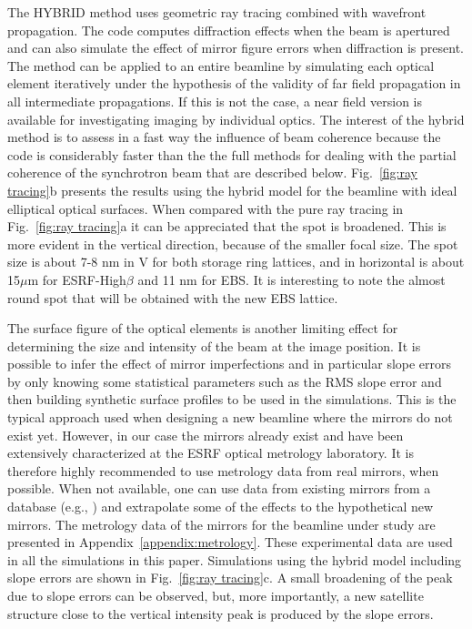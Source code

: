 \documentclass{iucr}              %
\begin{document}
The HYBRID method \cite{hybrid} uses geometric ray tracing combined with wavefront propagation. The code computes diffraction effects when the beam is apertured and can also simulate the effect of mirror figure errors when diffraction is present. The method can be applied to an entire beamline by simulating each optical element iteratively under the hypothesis of the validity of far field propagation in all intermediate propagations. If this is not the case, a near field version is available for investigating imaging by individual optics. The interest of the hybrid method is to assess in a fast way the influence of beam coherence because the code is considerably faster than the the full methods for dealing with the partial coherence of the synchrotron beam that are described below. Fig.~\ref{fig:ray tracing}b presents the results using the hybrid model for the beamline with ideal elliptical optical surfaces. When compared with the pure ray tracing in Fig.~\ref{fig:ray tracing}a it can be appreciated that the spot is broadened. This is more evident in the vertical direction, because of the smaller focal size. The spot size is about 7-8 nm in V for both storage ring lattices, and in horizontal is about 15$\mu$m for ESRF-High$\beta$ and 11 nm for EBS. It is interesting to note the almost round spot that will be obtained with the new EBS lattice. 

The surface figure of the optical elements is another limiting effect for determining the size and intensity of the beam at the image position. It is possible to infer the effect of mirror imperfections and in particular slope errors by only knowing some statistical parameters such as the RMS slope error  and then building synthetic surface profiles to be used in the simulations. This is the typical approach used when designing a new beamline where the mirrors do not exist yet. However, in our case the mirrors already exist and have been extensively characterized at the ESRF optical metrology laboratory. It is therefore highly recommended to use metrology data from real mirrors, when possible. When not available, one can use data from existing mirrors from a database (e.g., \cite{dabam}) and extrapolate some of the effects to the hypothetical new mirrors. The metrology data of the mirrors for the beamline under study are presented in Appendix~\ref{appendix:metrology}. These experimental data are used in all the simulations in this paper. Simulations using the hybrid model including slope errors are shown in Fig.~\ref{fig:ray tracing}c. A small broadening of the peak due to slope errors can be observed, but, more importantly, a new satellite structure close to the vertical intensity peak is produced by the slope errors. 
\end{document}
